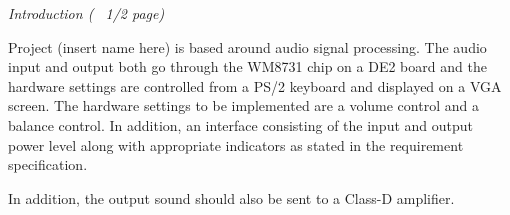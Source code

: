 \emph{Introduction (~ 1/2 page)}


Project (insert name here) %
is based around audio signal processing. The audio input and output both go through the WM8731 chip on a DE2 board and the hardware settings are controlled from a PS/2 keyboard and displayed on a VGA screen. The hardware settings to be implemented are a volume control and a balance control. In addition, an interface consisting of the input and output power level along with appropriate indicators as stated in the requirement specification.

In addition, the output sound should also be sent to a Class-D amplifier.
